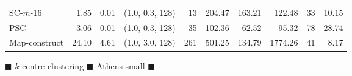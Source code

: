 \begin{figure}[h]
\begin{center}
\begin{minipage}{\textwidth}
{\begin{tabular}{@{}lrrcrrrrrr@{}}
        SC-$m$-16 & 1.85 & 0.01 & (1.0, 0.3, 128) & 13 & 204.47 & 163.21 & 122.48 & 33 & 10.15\\
        PSC & 3.06 & 0.01 & (1.0, 0.3, 128) & 35 & 102.36 & 62.52 & 95.32 & 78 & 28.74\\
        Map-construct & 24.10 & 4.61 & (1.0, 3.0, 128) & 261 & 501.25 & 134.79 & 1774.26 & 41 & 8.17\\
        \bottomrule
    \end{tabular}}
\end{minipage}
        \caption{$\blacksquare$ $k$-centre clustering $\blacksquare$ Athens-small  $\blacksquare$}
    \end{center} \end{figure}
\clearpage
\newpage 
%
\clearpage
